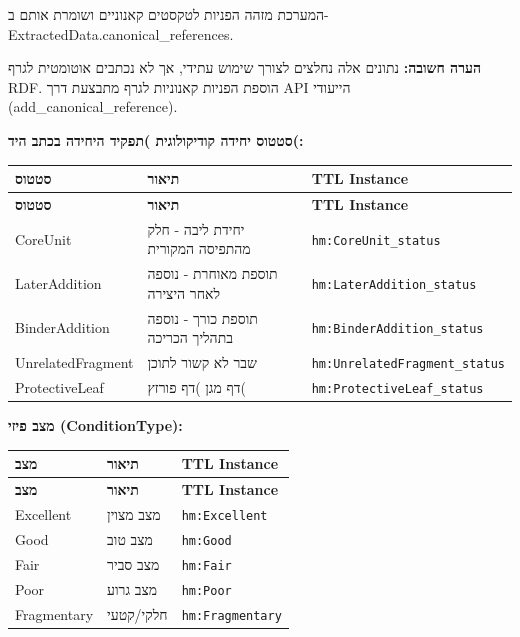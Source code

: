 \documentclass[12pt,a4paper]{article}
\newcommand{\ttlclass}[1]{\texttt{#1}}
\begin{document}
המערכת מזהה הפניות לטקסטים קאנוניים ושומרת אותם ב-\textenglish{ExtractedData.canonical\_references}.

\textbf{הערה חשובה:} נתונים אלה נחלצים לצורך שימוש עתידי, אך לא נכתבים אוטומטית לגרף RDF. הוספת הפניות קאנוניות לגרף מתבצעת דרך API הייעודי \textenglish{(add\_canonical\_reference)}.

\textbf{סטטוס יחידה קודיקולוגית )תפקיד היחידה בכתב היד(:}

\begin{longtable}{|p{4cm}|p{6cm}|L{6cm}|}
\hline
\textbf{סטטוס} & \textbf{תיאור} & \textbf{TTL Instance} \\
\hline
\endfirsthead
\hline
\textbf{סטטוס} & \textbf{תיאור} & \textbf{TTL Instance} \\
\hline
\endhead
\hline
\endfoot
\textenglish{CoreUnit} & יחידת ליבה - חלק מהתפיסה המקורית & \ttlclass{hm:CoreUnit\_status} \\
\hline
\textenglish{LaterAddition} & תוספת מאוחרת - נוספה לאחר היצירה & \ttlclass{hm:LaterAddition\_status} \\
\hline
\textenglish{BinderAddition} & תוספת כורך - נוספה בתהליך הכריכה & \ttlclass{hm:BinderAddition\_status} \\
\hline
\textenglish{UnrelatedFragment} & שבר לא קשור לתוכן & \ttlclass{hm:UnrelatedFragment\_status} \\
\hline
\textenglish{ProtectiveLeaf} & דף מגן )דף פורזץ( & \ttlclass{hm:ProtectiveLeaf\_status} \\
\hline
\end{longtable}

\textbf{מצב פיזי \textenglish{(ConditionType)}:}

\begin{longtable}{|p{4cm}|p{6cm}|L{6cm}|}
\hline
\textbf{מצב} & \textbf{תיאור} & \textbf{TTL Instance} \\
\hline
\endfirsthead
\hline
\textbf{מצב} & \textbf{תיאור} & \textbf{TTL Instance} \\
\hline
\endhead
\hline
\endfoot
\textenglish{Excellent} & מצב מצוין & \ttlclass{hm:Excellent} \\
\hline
\textenglish{Good} & מצב טוב & \ttlclass{hm:Good} \\
\hline
\textenglish{Fair} & מצב סביר & \ttlclass{hm:Fair} \\
\hline
\textenglish{Poor} & מצב גרוע & \ttlclass{hm:Poor} \\
\hline
\textenglish{Fragmentary} & חלקי/קטעי & \ttlclass{hm:Fragmentary} \\
\hline
\end{longtable}
\end{document}
